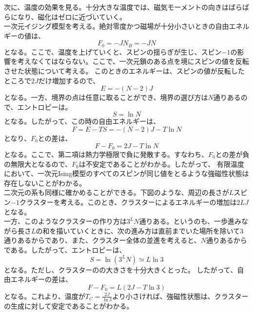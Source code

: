 \documentclass[a4paper,11pt]{jsarticle}
\numberwithin{equation}{section}
\begin{document}
次に、温度の効果を見る。十分大きな温度では、磁気モーメントの向きはばらばらになり、磁化はゼロに近づいていく。\\
一次元イジング模型を考える。絶対零度かつ磁場が十分小さいときの自由エネルギーの値は、
\begin{equation}
    F_0 = -JN_B = -JN
\end{equation}
となる。ここで、温度を上げていくと、スピンの揺らぎが生じ、スピン$-1$の影響を考えなくてはならない。ここで、一次元鎖のある点を境にスピンの値を反転させた状態について考える。
このときのエネルギーは、スピンの値が反転したところで$2J$だけ増加するので、
\begin{equation}
    E =-(N-2)J
\end{equation}
となる。一方、境界の点は任意に取ることができ、境界の選び方は$N$通りあるので、エントロピーは。
\begin{equation}
    S = \ln N
\end{equation}
となる。したがって、この時の自由エネルギーは、
\begin{equation}
    F = E - TS = -(N-2)J - T\ln N
\end{equation}
となり、$F_0$との差は、
\begin{equation}
    F - F_0 = 2J - T\ln N
\end{equation}
となる。ここで、第二項は熱力学極限で負に発散する。すなわち、$F_0$との差が負の無限大となるので、$F_0$は不安定であることがわかる。したがって、
有限温度において、一次元Ising模型のすべてのスピンが同じ値をとるような強磁性状態は存在しないことがわかる。\\

二次元の系も同様に確かめることができる。下図のような、周辺の長さが$L$スピン$-1$クラスターを考える。このとき、クラスターによるエネルギーの増加は$2LJ$となる。\\
一方、このようなクラスターの作り方は$3^L N$通りある。というのも、一歩進みながら長さ$L$の和を描いていくときに、次の進み方は直前までいた場所を除いて$3$通りあるからであり、また、クラスター全体の並進を考えると、$N$通りあるからである。したがって、エントロピーは、
\begin{equation}
    S = \ln (3^L N) \simeq L\ln 3
\end{equation}
となる。ただし、クラスターのの大きさを十分大きくとった。%
したがって、自由エネルギーの差は、
\begin{equation}
    F - F_0 =L(2J - T\ln 3)
\end{equation}
となる。これより、温度が$T_C = \frac{2J}{\ln 3}$より小さければ、強磁性状態は、クラスターの生成に対して安定であることがわかる。\\
\end{document}
